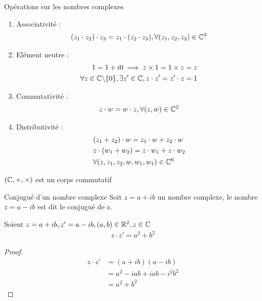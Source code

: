 \begin{proposition}{Opérations sur les nombres complexes}
\begin{enumerate}
\begin{enumerate}
    \item Associativité :
    \begin{align*}
    (z_1 \cdot z_2) \cdot z_3 = z_1 \cdot (z_2 \cdot z_3), \forall (z_1, z_2, z_3) \in \mathbb{C}^3
    \end{align*}
    \item Elément neutre :
        \begin{align*}
        1 = 1 + i0 \implies z \times 1 = 1 \times z = z \\
        \forall z \in \mathbb{C} \backslash \{0\}, \exists z' \in \mathbb{C}, z \cdot z' = z' \cdot z =1
        \end{align*}
    \item Commutativité :
        \begin{align*}
        z \cdot w = w \cdot z, \forall (z, w) \in \mathbb{C}^2
        \end{align*}
    \item Distributivité :
        \begin{align*}
        &(z_1 + z_2) \cdot w = z_1 \cdot w + z_2 \cdot w \\
        &z \cdot (w_1 + w_2) = z \cdot w_1 + z \cdot w_2 \\
        &\forall (z, z_1, z_2, w, w_1, w_1) \in \mathbb{C}^6
        \end{align*}
\end{enumerate}

\end{enumerate}
\end{proposition}

\begin{remarque}
    $(\mathbb{C}, +, \times)$ est un corps commutatif 
\end{remarque}

\begin{definition}{Conjugué d'un nombre complexe}
    Soit $z = a + ib$ un nombre complexe, le nombre $\overline{z} = a - ib$ est dit le conjugué de z.
\end{definition}

\begin{proposition}{}
    Soient $z = a + ib, z'= a - ib, (a, b) \in \mathbb{R}^2, z \in \mathbb{C}$
    \begin{align*}
        z \cdot z' = a^2 + b^2
    \end{align*}
    \begin{proof}
        \begin{align*}
            z \cdot z' &= (a + ib)(a - ib) \\
                        &= a^2 -iab + iab -i^2b^2 \\
                        &= a^2 + b^2
        \end{align*}
    \end{proof}
\end{proposition}

